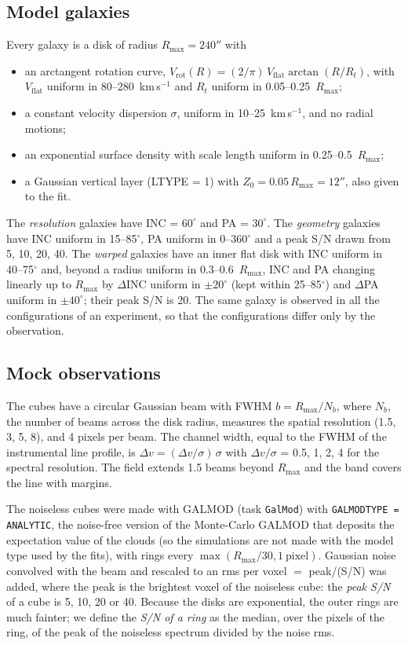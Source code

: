 \documentclass[10pt,a4paper]{article}
\newcommand{\vrot}{V_\mathrm{rot}}
\newcommand{\rmax}{R_\mathrm{max}}
\newcommand{\code}[1]{\texttt{#1}}
\newcommand{\kms}{km\,s$^{-1}$}
\newcommand{\dvs}{\Delta v/\sigma}
\begin{document}
\subsection{Model galaxies}
Every galaxy is a disk of radius $\rmax = 240''$ with
\begin{itemize}
\item an arctangent rotation curve, $\vrot(R) = (2/\pi)\,V_\mathrm{flat}\arctan(R/R_t)$, with
  $V_\mathrm{flat}$ uniform in 80--280~\kms{} and $R_t$ uniform in 0.05--0.25~$\rmax$;
\item a constant velocity dispersion $\sigma$, uniform in 10--25~\kms, and no radial motions;
\item an exponential surface density with scale length uniform in 0.25--0.5~$\rmax$;
\item a Gaussian vertical layer (LTYPE = 1) with $Z_0 = 0.05\,\rmax = 12''$, also given to the fit.
\end{itemize}
The \emph{resolution} galaxies have INC = $60^\circ$ and PA = $30^\circ$. The \emph{geometry}
galaxies have INC uniform in 15--85$^\circ$, PA uniform in 0--360$^\circ$ and a peak S/N drawn from
5, 10, 20, 40. The \emph{warped} galaxies have an inner flat disk with INC uniform in 40--75$^\circ$
and, beyond a radius uniform in 0.3--0.6~$\rmax$, INC and PA changing linearly up to $\rmax$ by
$\Delta$INC uniform in $\pm20^\circ$ (kept within 25--85$^\circ$) and $\Delta$PA uniform in
$\pm40^\circ$; their peak S/N is 20. The same galaxy is observed in all the configurations of an
experiment, so that the configurations differ only by the observation.

\subsection{Mock observations}
The cubes have a circular Gaussian beam with FWHM $b = \rmax/N_b$, where $N_b$, the number of beams
across the disk radius, measures the spatial resolution (1.5, 3, 5, 8), and 4 pixels per beam. The
channel width, equal to the FWHM of the instrumental line profile, is $\Delta v = (\dvs)\,\sigma$
with $\dvs$ = 0.5, 1, 2, 4 for the spectral resolution. The field extends 1.5 beams beyond $\rmax$ and
the band covers the line with margins.

The noiseless cubes were made with GALMOD (task \code{GalMod}) with \code{GALMODTYPE = ANALYTIC}, the
noise-free version of the Monte-Carlo GALMOD that deposits the expectation value of the clouds (so
the simulations are not made with the model type used by the fits), with rings every
$\max(\rmax/30, 1~\text{pixel})$. Gaussian noise convolved with the beam and rescaled to an rms per
voxel $=$ peak/(S/N) was added, where the peak is the brightest voxel of the noiseless cube: the
\emph{peak S/N} of a cube is 5, 10, 20 or 40. Because the disks are exponential, the outer rings are
much fainter; we define the \emph{S/N of a ring} as the median, over the pixels of the ring, of the
peak of the noiseless spectrum divided by the noise rms.
\end{document}

